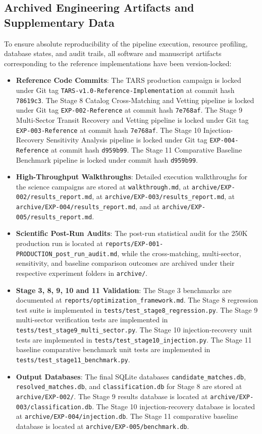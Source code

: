 \subsection{Archived Engineering Artifacts and Supplementary Data} \label{sec:app_artifacts}
To ensure absolute reproducibility of the pipeline execution, resource profiling, database states, and audit trails, all software and manuscript artifacts corresponding to the reference implementations have been version-locked:
\begin{itemize}
    \item \textbf{Reference Code Commits}: The TARS production campaign is locked under Git tag \texttt{TARS-v1.0-Reference-Implementation} at commit hash \texttt{78619c3}. The Stage 8 Catalog Cross-Matching and Vetting pipeline is locked under Git tag \texttt{EXP-002-Reference} at commit hash \texttt{7e768af}. The Stage 9 Multi-Sector Transit Recovery and Vetting pipeline is locked under Git tag \texttt{EXP-003-Reference} at commit hash \texttt{7e768af}. The Stage 10 Injection-Recovery Sensitivity Analysis pipeline is locked under Git tag \texttt{EXP-004-Reference} at commit hash \texttt{d959b99}. The Stage 11 Comparative Baseline Benchmark pipeline is locked under commit hash \texttt{d959b99}.
    \item \textbf{High-Throughput Walkthroughs}: Detailed execution walkthroughs for the science campaigns are stored at \texttt{walkthrough.md}, at \texttt{archive/EXP-002/results\_report.md}, at \texttt{archive/EXP-003/results\_report.md}, at \texttt{archive/EXP-004/results\_report.md}, and at \texttt{archive/EXP-005/results\_report.md}.
    \item \textbf{Scientific Post-Run Audits}: The post-run statistical audit for the 250K production run is located at \texttt{reports/EXP-001-PRODUCTION\_post\_run\_audit.md}, while the cross-matching, multi-sector, sensitivity, and baseline comparison outcomes are archived under their respective experiment folders in \texttt{archive/}.
    \item \textbf{Stage 3, 8, 9, 10 and 11 Validation}: The Stage 3 benchmarks are documented at \texttt{reports/optimization\_framework.md}. The Stage 8 regression test suite is implemented in \texttt{tests/test\_stage8\_regression.py}. The Stage 9 multi-sector verification tests are implemented in \texttt{tests/test\_stage9\_multi\_sector.py}. The Stage 10 injection-recovery unit tests are implemented in \texttt{tests/test\_stage10\_injection.py}. The Stage 11 baseline comparative benchmark unit tests are implemented in \texttt{tests/test\_stage11\_benchmark.py}.
    \item \textbf{Output Databases}: The final SQLite databases \texttt{candidate\_matches.db}, \texttt{resolved\_matches.db}, and \texttt{classification.db} for Stage 8 are stored at \texttt{archive/EXP-002/}. The Stage 9 results database is located at \texttt{archive/EXP-003/classification.db}. The Stage 10 injection-recovery database is located at \texttt{archive/EXP-004/injection.db}. The Stage 11 comparative baseline database is located at \texttt{archive/EXP-005/benchmark.db}.
\end{itemize}

